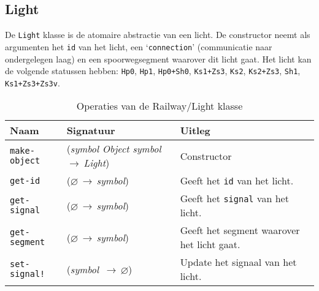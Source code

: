 \documentclass[a4paper, 11pt]{article}
\newcommand{\naar}{\,$\rightarrow$\,}
\renewcommand{\empty}{$\varnothing$}
\newcommand{\<}{\scriptsize\textless\normalsize}
\renewcommand{\>}{\scriptsize\textgreater\normalsize}
\begin{document}
\subsection{Light} %
De \texttt{Light} klasse is de atomaire abstractie van een licht. De constructor neemt als argumenten het \texttt{id} van het licht, een \lq\texttt{connection}' (communicatie naar ondergelegen laag) en een spoorwegsegment waarover dit licht gaat. Het licht kan de volgende statussen hebben: \texttt{Hp0}, \texttt{Hp1}, \texttt{Hp0+Sh0}, \texttt{Ks1+Zs3}, \texttt{Ks2}, \texttt{Ks2+Zs3}, \texttt{Sh1}, \texttt{Ks1+Zs3+Zs3v}.
\begin{table}[H]
	\begin{center}
		{
		\begin{tabular}{|l l l|}
			\hline
			\textbf{Naam} & \textbf{Signatuur} & \textbf{Uitleg}\\
			\hline
			\texttt{make-object} & (\textit{symbol Object symbol} \naar \textit{Light}) & Constructor\\
			\hline
			\texttt{get-id} & (\empty \naar \textit{symbol}) & Geeft het \texttt{id} van het licht.\\
			\texttt{get-signal} & (\empty \naar \textit{symbol}) & Geeft het \texttt{signal} van het licht.\\
			\texttt{get-segment} & (\empty \naar \textit{symbol}) & Geeft het segment waarover het licht gaat.\\
			\texttt{set-signal!} & (\textit{symbol} \naar \empty) & Update het signaal van het licht.\\
			\hline
		\end{tabular}}
		\caption{Operaties van de Railway/Light klasse}
	\end{center}
\end{table}

\end{document}
